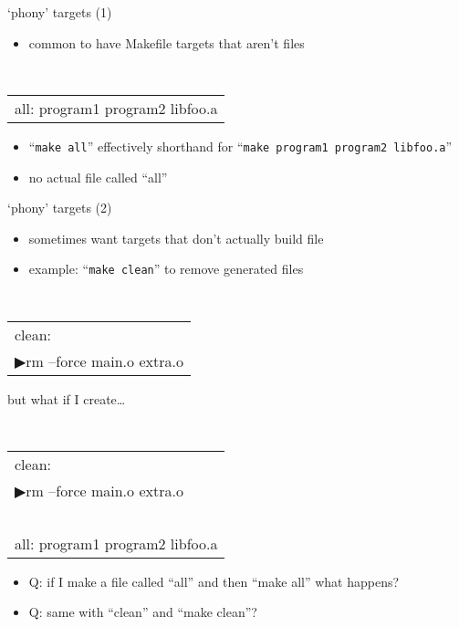 \begin{frame}{`phony' targets (1)}
\begin{itemize}
\item common to have Makefile targets that aren't files
\end{itemize}
{\tt
\begin{tabular}{l}
all: program1 program2 libfoo.a \\
\end{tabular}
}
\begin{itemize}
\item ``\texttt{make all}'' effectively shorthand for ``\texttt{make program1 program2 libfoo.a}''
\item no actual file called ``all''
\end{itemize}
\end{frame}


\begin{frame}{`phony' targets (2)}
\begin{itemize}
\item sometimes want targets that don't actually build file
\item example: ``\texttt{make clean}'' to remove generated files
\end{itemize}
{\tt
\begin{tabular}{l}
clean: \\
▶\hspace{3cm}rm --force main.o extra.o \\
\end{tabular}
}
\end{frame}

\begin{frame}{but what if I create\ldots}

{\tt
\begin{tabular}{l}
clean: \\
▶\hspace{3cm}rm --force main.o extra.o \\
~ \\
all: program1 program2 libfoo.a \\
\end{tabular}
}
\begin{itemize}
\item Q: if I make a file called ``all'' and then ``make all'' what happens?
\item Q: same with ``clean'' and ``make clean''?
\end{itemize}
\end{frame}

